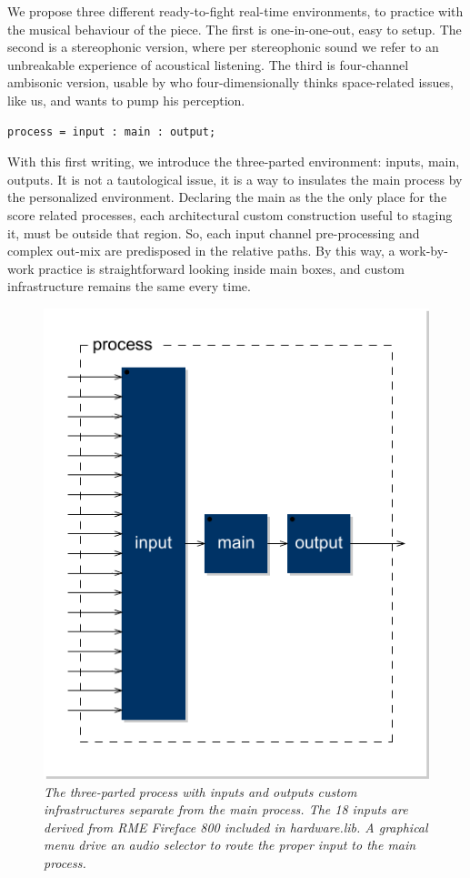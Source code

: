 \documentclass[twoside,a4paper]{article}
\begin{document}
We propose three different ready-to-fight real-time environments, to practice with the musical behaviour of the piece. The first is one-in-one-out, easy to setup. The second is a stereophonic version, where per stereophonic sound we refer to an unbreakable experience of acoustical listening. The third is four-channel ambisonic version, usable by who four-dimensionally thinks space-related issues, like us, and wants to pump his perception. 

\begin{lstlisting}
process = input : main : output;
\end{lstlisting}

With this first writing, we introduce the three-parted environment: inputs, main, outputs. It is not a tautological issue, it is a way to insulates the main process by the personalized environment. Declaring the main as the the only place for the score related processes, each architectural custom construction useful to staging it, must be outside that region. So, each input channel pre-processing and complex out-mix are predisposed in the relative paths. By this way, a work-by-work practice is straightforward looking inside main boxes, and custom infrastructure remains the same every time. 

\begin{figure}[ht]
\centerline{\includegraphics[width=.45\textwidth]{img/lais-process}}
\caption{\label{re-dia-6c}{\it The three-parted process with inputs and outputs custom infrastructures separate from the main process. The 18 inputs are derived from \emph{RME Fireface 800} included in \emph{hardware.lib}. A graphical menu drive an audio selector to route the proper input to the main process.}}
\end{figure}

\end{document}
